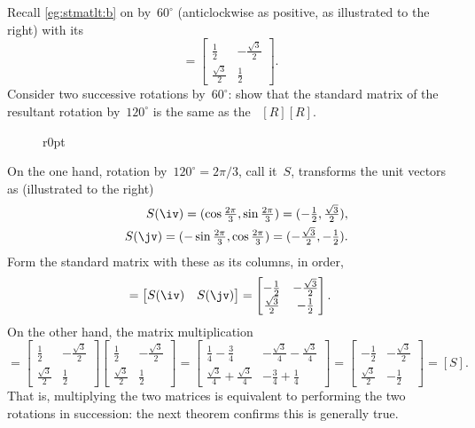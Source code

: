 \begin{example} 
Recall \cref{eg:stmatlt:b} on  by~\(60^\circ\) (anticlockwise as positive, as illustrated to the right) with its 
\begin{equation*}
[R]=\begin{bmatrix} \frac12&-\frac{\sqrt3}2
\\\frac{\sqrt3}2&\frac12 \end{bmatrix}.
\end{equation*}
Consider two successive rotations by~\(60^\circ\): show that the standard matrix of the resultant rotation by~\(120^\circ\)  is the same as the ~\([R][R]\).

\begin{wrapfigure}r{0pt}
\end{wrapfigure}
\begin{solution} 
On the one hand, rotation by~\(120^\circ=2\pi/3\), call it~\(S\), transforms the unit vectors as (illustrated to the right)
\begin{eqnarray*}
&&S(\iv)=(\cos\tfrac{2\pi}3,\sin\tfrac{2\pi}3)
=(-\tfrac12,\tfrac{\sqrt3}2),
\\&&S(\jv)=(-\sin\tfrac{2\pi}3,\cos\tfrac{2\pi}3)
=(-\tfrac{\sqrt3}2,-\tfrac12).
\end{eqnarray*}
Form the standard matrix with these as its columns, in order,
\begin{equation*}
[S]=\begin{bmatrix} S(\iv)&S(\jv) \end{bmatrix}
=\begin{bmatrix} -\frac12&-\frac{\sqrt3}2
\\\frac{\sqrt3}2&-\frac12 \end{bmatrix}.
\end{equation*}
On the other hand, the matrix multiplication
\begin{equation*}
[R][R]
=\begin{bmatrix} \frac12&-\frac{\sqrt3}2
\\\frac{\sqrt3}2&\frac12 \end{bmatrix}\begin{bmatrix} \frac12&-\frac{\sqrt3}2
\\\frac{\sqrt3}2&\frac12 \end{bmatrix}
=\begin{bmatrix} \tfrac14-\tfrac34 & -\tfrac{\sqrt3}4-\tfrac{\sqrt3}4
\\ \tfrac{\sqrt3}4+\tfrac{\sqrt3}4 & -\tfrac34+\tfrac14\end{bmatrix}
=\begin{bmatrix} -\frac12&-\frac{\sqrt3}2
\\\frac{\sqrt3}2&-\frac12 \end{bmatrix}=[S].
\end{equation*}
That is, multiplying the two matrices is equivalent to performing the two rotations in succession: the next theorem confirms this is generally true.
\aqed

\end{solution}
\end{example}




